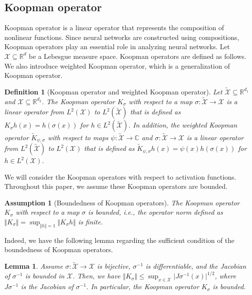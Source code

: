 \documentclass[twoside]{article}
\newtheorem{lemma}[proposition]{Lemma}
\newtheorem{definition}[proposition]{Definition}
\newtheorem{assumption}{Assumption}
\def\mcl#1{\mathcal{#1}}
\begin{document}
\subsection{Koopman operator}
Koopman operator is a linear operator that represents the composition of nonlinear functions.
Since neural networks are constructed using compositions, Koopman operators play an essential role in analyzing neural networks.
Let $\mcl{X}\subseteq\mathbb{R}^{d}$ be a Lebesgue measure space.
Koopman operators are defined as follows.
We also introduce weighted Koopman operator, which is a generalization of Koopman operator.
\begin{definition}[Koopman operator and weighted Koopman operator]
Let $\tilde{\mcl{X}}\subseteq \mathbb{R}^{d_1}$ and $\mcl{X}\subseteq \mathbb{R}^{d_2}$.
The {\em Koopman operator} $K_{\sigma}$ with respect to a map $\sigma:\tilde{\mcl{X}}\to\mcl{X}$ is a linear operator from $L^2(\mcl{X})$ to $L^2(\tilde{\mcl{X}})$ that is defined as $K_{\sigma}h(x)=h(\sigma(x))$ for $h\in L^2(\tilde{\mcl{X}})$.
In addition, the {\em weighted Koopman operator} $\tilde{K}_{\psi,\sigma}$ with respect to maps $\psi:\tilde{\mcl{X}}\to\mathbb{C}$ and $\sigma:\tilde{\mcl{X}}\to\mcl{X}$ is a linear operator from $L^2(\tilde{\mcl{X}})$ to $L^2(\mcl{X})$ that is defined as $\tilde{K}_{\psi,\sigma}h(x)=\psi(x)h(\sigma(x))$ for $h\in L^2(\mcl{X})$.
\end{definition}

We will consider the Koopman operators with respect to activation functions.
Throughout this paper, we assume these Koopman operators are bounded.
\begin{assumption}
[Boundedness of Koopman operators]\label{assum: boundedness_koopman}
The Koopman operator $K_{\sigma}$ with respect to a map $\sigma$ is bounded, i.e., the operator norm defined as $\Vert K_{\sigma}\Vert=\sup_{\Vert h\Vert=1}\Vert K_{\sigma}h\Vert$ is finite.
\end{assumption}
Indeed, we have the following lemma regarding the sufficient condition of the boundedness of Koopman operators.

\begin{lemma}\label{lem:koopman_bounded}
Assume $\sigma:\tilde{\mcl{X}}\to\mcl{X}$ is bijective, $\sigma^{-1}$ is differentiable, and the Jacobian of $\sigma^{-1}$ is bounded in $\mcl{X}$.
Then, we have $\Vert K_{\sigma}\Vert\le \sup_{x\in {\mcl{X}}} \vert J\sigma^{-1}(x)\vert ^{1/2}$, where $J\sigma^{-1}$ is the Jacobian of $\sigma^{-1}$.
In particular, the Koopman operator $K_{\sigma}$ is bounded.
\end{lemma}
\end{document}
